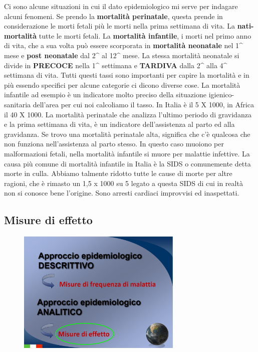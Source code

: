 Ci sono alcune situazioni in cui il dato epidemiologico mi serve per
indagare alcuni fenomeni. Se prendo la \textbf{mortalità perinatale},
questa prende in considerazione le morti fetali più le morti nella prima
settimana di vita. La \textbf{nati-mortalità} tutte le morti fetali. La
\textbf{mortalità infantile}, i morti nel primo anno di vita, che a sua
volta può essere scorporata in \textbf{mortalità neonatale} nel 1\^{}
mese e \textbf{post neonatale} dal 2\^{} al 12\^{} mese. La stessa
mortalità neonatale si divide in \textbf{PRECOCE} nella 1\^{} settimana
e \textbf{TARDIVA} dalla 2\^{} alla 4\^{} settimana di vita. Tutti
questi tassi sono importanti per capire la mortalità e in più essendo
specifici per alcune categorie ci dicono diverse cose. La mortalità
infantile ad esempio è un indicatore molto preciso della situazione
igienico-sanitaria dell'area per cui noi calcoliamo il tasso. In Italia
è il 5 X 1000, in Africa il 40 X 1000. La mortalità perinatale che
analizza l'ultimo periodo di gravidanza e la prima settimana di vita, è
un indicatore dell'assistenza al parto ed alla gravidanza. Se trovo una
mortalità perinatale alta, significa che c'è qualcosa che non funziona
nell'assistenza al parto stesso. In questo caso muoiono per
malformazioni fetali, nella mortalità infantile si muore per malattie
infettive. La causa più comune di mortalità infantile in Italia è la
SIDS o comunemente detta morte in culla. Abbiamo talmente ridotto tutte
le cause di morte per altre ragioni, che è rimasto un 1,5 x 1000 su 5
legato a questa SIDS di cui in realtà non si conosce bene l'origine.
Sono arresti cardiaci improvvisi ed inaspettati.

\subsection{Misure di effetto}


\begin{figure}[!ht]
\centering
	\includegraphics[width=0.7\textwidth]{03/image14.png}
\end{figure}

